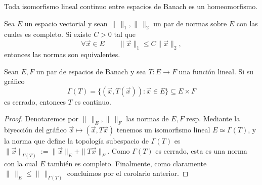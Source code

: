 \documentclass[topologia-analisis.tex]{subfiles}
\begin{document}
\begin{cor}
	Toda isomorfismo lineal continuo entre espacios de Banach es un homeomorfismo.
\end{cor}
\begin{cor}
	Sea $E$ un espacio vectorial y sean $\|\,\|_1, \|\,\|_2$ un par de normas sobre $E$ con las cuales es completo.
	Si existe $C > 0$ tal que
	\[
		\forall \vec x \in E \qquad \|\vec x\|_1 \le C\|\vec x\|_2,
	\]
	entonces las normas son equivalentes.
\end{cor}

\begin{thmi}
	Sean $E, F$ un par de espacios de Banach y sea $T \colon E \to F$ una función lineal.
	Si su gráfico
	\[
		\Gamma(T) = \{ (\vec x, T(\vec x)) : \vec x \in E \} \subseteq E\times F
	\]
	es cerrado, entonces $T$ es continuo.
\end{thmi}
\begin{proof}
	Denotaremos por $\|\,\|_E, \|\,\|_F$ las normas de $E, F$ resp.
	Mediante la biyección del gráfico $\vec x \mapsto (\vec x, T\vec x)$ tenemos un isomorfismo lineal $E \simeq \Gamma(T)$,
	y la norma que define la topología subespacio de $\Gamma(T)$ es $\|\vec x\|_{\Gamma(T)} := \|\vec x\|_E + \|T\vec x\|_F$.
	Como $\Gamma(T)$ es cerrado, esta es una norma con la cual $E$ también es completo.
	Finalmente, como claramente $\|\,\|_E \le \|\,\|_{\Gamma(T)}$ concluimos por el corolario anterior.
\end{proof}
\thmdep{}
\end{document}
